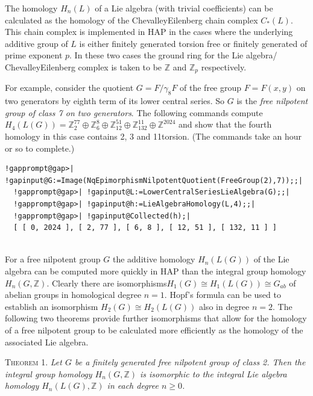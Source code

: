 \documentclass[a4paper,11pt]{report}
\begin{document}
{{ The homology $H_n(L)$ of a Lie algebra (with trivial coefficients) can be calculated as the homology
of the Chevalley\texttt{}Eilenberg chain complex $C_\ast(L)$. This chain complex is implemented in \textsc{HAP} in the cases where the underlying additive group of $L$ is either finitely generated torsion free or finitely generated of prime
exponent $p$. In these two cases the ground ring for the Lie algebra/
Chevalley\texttt{}Eilenberg complex is taken to be $\mathbb Z$ and $\mathbb Z_p$ respectively. 

 For example, consider the quotient $G=F/\gamma_8F$ of the free group $F=F(x,y)$ on two generators by eighth term of its lower central series. So $G$ is the \emph{free nilpotent group of class 7 on two generators}. The following commands compute $H_4(L(G)) = \mathbb Z_2^{77} \oplus \mathbb Z_6^8 \oplus \mathbb Z_{12}^{51}
\oplus \mathbb Z_{132}^{11} \oplus \mathbb Z^{2024}$ and show that the fourth homology in this case contains 2\texttt{},
3\texttt{} and 11\texttt{}torsion. (The commands take an
hour or so to complete.) 
\begin{Verbatim}[commandchars=!@|,fontsize=\small,frame=single,label=Example]
  !gapprompt@gap>| !gapinput@G:=Image(NqEpimorphismNilpotentQuotient(FreeGroup(2),7));;|
  !gapprompt@gap>| !gapinput@L:=LowerCentralSeriesLieAlgebra(G);;|
  !gapprompt@gap>| !gapinput@h:=LieAlgebraHomology(L,4);;|
  !gapprompt@gap>| !gapinput@Collected(h);|
  [ [ 0, 2024 ], [ 2, 77 ], [ 6, 8 ], [ 12, 51 ], [ 132, 11 ] ]
  
\end{Verbatim}
 

 For a free nilpotent group $G$ the additive homology $H_n(L(G))$ of the Lie algebra can be computed more quickly in \textsc{HAP} than the integral group homology $H_n(G,\mathbb Z)$. Clearly there are isomorphisms$H_1(G) \cong H_1(L(G)) \cong G_{ab}$ of abelian groups in homological degree $n=1$. Hopf's formula can be used to establish an isomorphism $H_2(G) \cong H_2(L(G))$ also in degree $n=2$. The following two theorems provide further isomorphisms that allow for the
homology of a free nilpotent group to be calculated more efficiently as the
homology of the associated Lie algebra. 

\textsc{Theorem 1.} \cite{kuzmin} \emph{Let $G$ be a finitely generated free nilpotent group of class 2. Then the integral
group homology $H_n(G,\mathbb Z)$ is isomorphic to the integral Lie algebra homology $H_n(L(G),\mathbb Z)$ in each degree $n\ge0$.} 

}}
\end{document}
